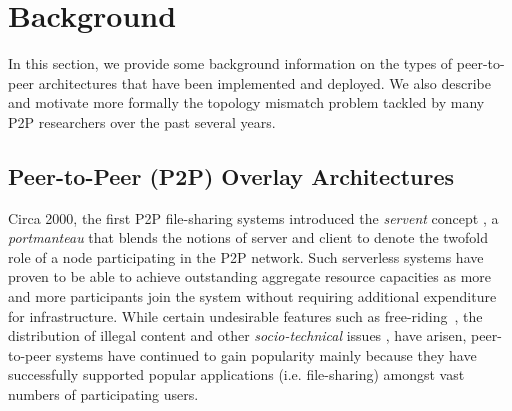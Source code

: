 \section{Background}
\label{section:background}


In this section, we provide some background information on the types of
peer-to-peer architectures that have been implemented and deployed. We also
describe and motivate more formally the topology mismatch problem tackled by
many P2P researchers over the past several years.

\subsection{Peer-to-Peer (P2P) Overlay Architectures}
Circa 2000, the first P2P file-sharing systems introduced the \emph{servent}
concept \cite{gnutella}, a \emph{portmanteau} that blends the notions of server
and client to denote the twofold role of a node participating in the P2P
network. Such serverless systems have proven to be able to achieve outstanding
aggregate resource capacities as more and more participants join the system
without requiring additional expenditure for infrastructure. While certain
undesirable features such as 
free-riding~\cite{saroiu_measurefileshare_2002,adar_gnutellafreeriders_2000,hughes_gnutellafreeride_2005},
the distribution of illegal content and other \emph{socio-technical}
issues \cite{hughes_socp2p_2008}, have arisen, peer-to-peer systems have
continued to gain popularity mainly because they have successfully supported
popular applications (i.e. file-sharing) amongst vast numbers of participating
users.


